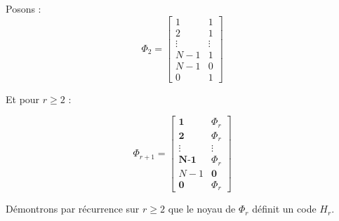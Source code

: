 \documentclass[10pt]{article}
\begin{document}
Posons :
$$\Phi_2 = \begin{bmatrix}
1&1 \\
2&1 \\
\vdots & \vdots \\
{N-1} & 1 \\
{N-1} & 0 \\
0 & 1
\end{bmatrix}$$

Et pour $r \geq 2$ :

$$\Phi_{r+1}= \begin{bmatrix}
\textbf{1}&\Phi_r \\
\textbf{2}&\Phi_r \\
\vdots & \vdots \\
\textbf{N-1} & \Phi_r \\
{N-1} & \textbf{0} \\
\textbf{0} & \Phi_r
\end{bmatrix} $$

Démontrons par récurrence sur $r \geq 2$ que le noyau de $\Phi_r$ définit un code $H_r$.
\end{document}
